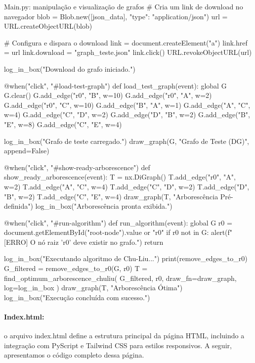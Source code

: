 \documentclass[12pt,a4paper]{article}
\def\texttt#1{#1}%
\begin{document}
\begin{pybox}[label={lst:draw_graph}]{Main.py: manipulação e visualização de grafos}
    # Cria um link de download no navegador
    blob = Blob.new([json_data], {"type": "application/json"})
    url = URL.createObjectURL(blob)

    # Configura e dispara o download
    link = document.createElement("a")
    link.href = url
    link.download = "graph_teste.json"
    link.click()
    URL.revokeObjectURL(url)

    log_in_box("Download do grafo iniciado.")

@when("click", "#load-test-graph")
def load_test_graph(event):
    global G
    G.clear()
    G.add_edge("r0", "B", w=10)
    G.add_edge("r0", "A", w=2)
    G.add_edge("r0", "C", w=10)
    G.add_edge("B", "A", w=1)
    G.add_edge("A", "C", w=4)
    G.add_edge("C", "D", w=2)
    G.add_edge("D", "B", w=2)
    G.add_edge("B", "E", w=8)
    G.add_edge("C", "E", w=4)

    log_in_box("Grafo de teste carregado.")
    draw_graph(G, "Grafo de Teste (DG)", append=False)

@when("click", "#show-ready-arborescence")
def show_ready_arborescence(event):
    T = nx.DiGraph()
    T.add_edge("r0", "A", w=2)
    T.add_edge("A", "C", w=4)
    T.add_edge("C", "D", w=2)
    T.add_edge("D", "B", w=2)
    T.add_edge("C", "E", w=4)
    draw_graph(T, "Arborescência Pré-definida")
    log_in_box("Arborescência pronta exibida.")


@when("click", "#run-algorithm")
def run_algorithm(event):
    global G
    r0 = document.getElementById("root-node").value or "r0"
    if r0 not in G:
        alert(f"[ERRO] O nó raiz '{r0}' deve existir no grafo.")
        return

    log_in_box("Executando algoritmo de Chu-Liu...")
    print(remove_edges_to_r0)
    G_filtered = remove_edges_to_r0(G, r0)
    T = find_optimum_arborescence_chuliu(
        G_filtered, r0, draw_fn=draw_graph, log=log_in_box
    )
    draw_graph(T, "Arborescência Ótima")
    log_in_box("Execução concluída com sucesso.")
\end{pybox}

\paragraph{\texttt{Index.html}:} o arquivo \texttt{index.html} define a estrutura principal da página HTML, incluindo a integração com PyScript e Tailwind CSS para estilos responsivos. A seguir, apresentamos o código completo dessa página.     
\end{document}
